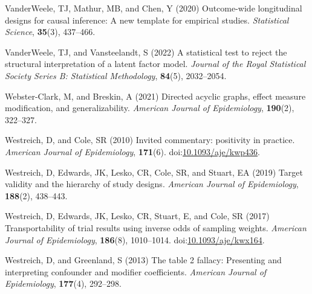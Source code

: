 \documentclass[
  single column]{article}
\newlength{\cslhangindent}
\newenvironment{CSLReferences}[2] %
 {\begin{list}{}{%
  \setlength{\itemindent}{0pt}
  \setlength{\leftmargin}{0pt}
  \setlength{\parsep}{0pt}
  \ifodd #1
   \setlength{\leftmargin}{\cslhangindent}
   \setlength{\itemindent}{-1\cslhangindent}
  \fi
  \setlength{\itemsep}{#2\baselineskip}}}
 {\end{list}}
\begin{document}
\begin{CSLReferences}{1}{0}
VanderWeele, TJ, Mathur, MB, and Chen, Y (2020) Outcome-wide
longitudinal designs for causal inference: A new template for empirical
studies. \emph{Statistical Science}, \textbf{35}(3), 437--466.

VanderWeele, TJ, and Vansteelandt, S (2022) A statistical test to reject
the structural interpretation of a latent factor model. \emph{Journal of
the Royal Statistical Society Series B: Statistical Methodology},
\textbf{84}(5), 2032--2054.

Webster-Clark, M, and Breskin, A (2021) Directed acyclic graphs, effect
measure modification, and generalizability. \emph{American Journal of
Epidemiology}, \textbf{190}(2), 322--327.

Westreich, D, and Cole, SR (2010) Invited commentary: positivity in
practice. \emph{American Journal of Epidemiology}, \textbf{171}(6).
doi:\href{https://doi.org/10.1093/aje/kwp436}{10.1093/aje/kwp436}.

Westreich, D, Edwards, JK, Lesko, CR, Cole, SR, and Stuart, EA (2019)
Target validity and the hierarchy of study designs. \emph{American
Journal of Epidemiology}, \textbf{188}(2), 438--443.

Westreich, D, Edwards, JK, Lesko, CR, Stuart, E, and Cole, SR (2017)
Transportability of trial results using inverse odds of sampling
weights. \emph{American Journal of Epidemiology}, \textbf{186}(8),
1010--1014.
doi:\href{https://doi.org/10.1093/aje/kwx164}{10.1093/aje/kwx164}.

Westreich, D, and Greenland, S (2013) The table 2 fallacy: Presenting
and interpreting confounder and modifier coefficients. \emph{American
Journal of Epidemiology}, \textbf{177}(4), 292--298.

\end{CSLReferences}
\end{document}
